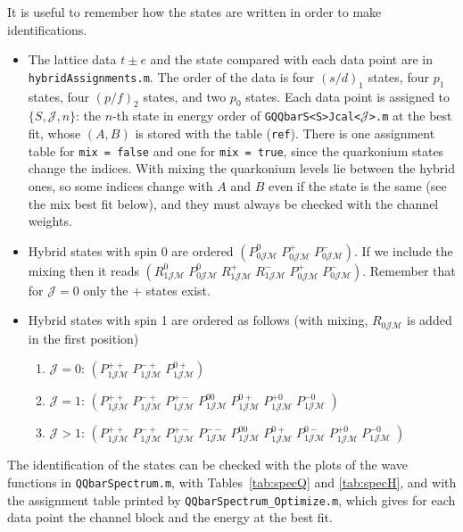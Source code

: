 \documentclass[11pt, a4paper]{article}
\begin{document}
It is useful to remember how the states are written in order to make identifications. 
\begin{itemize}
    \item The lattice data $t\pm e$ and the state compared with each data point are in \texttt{hybridAssignments.m}. The order of the data is four $(s/d)_1$ states, four $p_1$ states, four $(p/f)_2$ states, and two $p_0$ states. Each data point is assigned to $\{S, \mathcal{J}, n\}$: the $n$-th state in energy order of \texttt{GQQbarS<S>Jcal<$\mathcal{J}$>.m} at the best fit, whose $(A,B)$ is stored with the table (\texttt{ref}). There is one assignment table for \texttt{mix = false} and one for \texttt{mix = true}, since the quarkonium states change the indices. With mixing the quarkonium levels lie between the hybrid ones, so some indices change with $A$ and $B$ even if the state is the same (see the mix best fit below), and they must always be checked with the channel weights.
    \item Hybrid states with spin 0 are ordered $\left( P^0_{0\mathcal{JM}} \; P^+_{0\mathcal{JM}} \; P^-_{0\mathcal{JM}}   \right)$. If we include the mixing then it reads $\left( R^0_{1\mathcal{JM}}\; P^0_{0\mathcal{JM}} \; R^+_{1\mathcal{JM}}\;R^-_{1\mathcal{JM}}\; P^+_{0\mathcal{JM}} \; P^-_{0\mathcal{JM}}   \right)$. Remember that for $\mathcal{J}=0$ only the $+$ states exist.
    \item Hybrid states with spin 1 are ordered as follows (with mixing, $R_{0\mathcal{JM}}$ is added in the first position)
    \begin{enumerate}
        \item $\mathcal{J}=0$: $\left( P^{++}_{1\mathcal{JM}} \; 
        P^{-+}_{1\mathcal{JM}} \; P^{0+}_{1\mathcal{JM}}   \right)$
        \item $\mathcal{J}=1$: $\left( P^{++}_{1\mathcal{JM}} \; 
        P^{-+}_{1\mathcal{JM}} \; 
        P^{+-}_{1\mathcal{JM}} \; P^{00}_{1\mathcal{JM}} \; P^{0+}_{1\mathcal{JM}} \; P^{+0}_{1\mathcal{JM}} \; 
        P^{-0}_{1\mathcal{JM}} \;\right)$
        \item $\mathcal{J}>1$: $\left( P^{++}_{1\mathcal{JM}} \; 
        P^{-+}_{1\mathcal{JM}} \; 
        P^{+-}_{1\mathcal{JM}} \; 
        P^{--}_{1\mathcal{JM}} \;
        P^{00}_{1\mathcal{JM}} \; P^{0+}_{1\mathcal{JM}} \; 
        P^{0-}_{1\mathcal{JM}} \; P^{+0}_{1\mathcal{JM}} \; 
        P^{-0}_{1\mathcal{JM}} \;\right)$
    \end{enumerate}
\end{itemize}
The identification of the states can be checked with the plots of the wave functions in \texttt{QQbarSpectrum.m}, with Tables~\ref{tab:specQ} and \ref{tab:specH}, and with the assignment table printed by \texttt{QQbarSpectrum\_Optimize.m}, which gives for each data point the channel block and the energy at the best fit.
\end{document}
